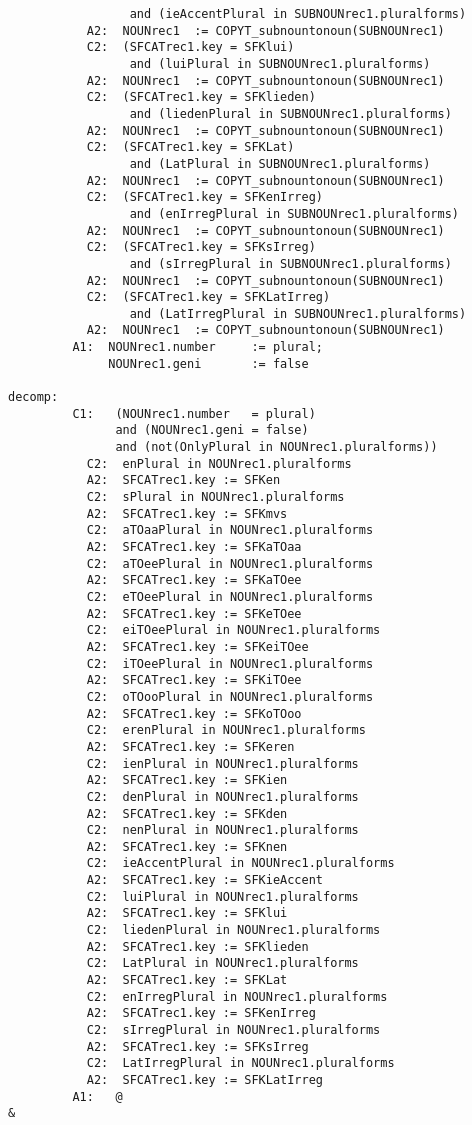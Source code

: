 \begin{verbatim}
                 and (ieAccentPlural in SUBNOUNrec1.pluralforms)
           A2:  NOUNrec1  := COPYT_subnountonoun(SUBNOUNrec1)
           C2:  (SFCATrec1.key = SFKlui) 
                 and (luiPlural in SUBNOUNrec1.pluralforms)
           A2:  NOUNrec1  := COPYT_subnountonoun(SUBNOUNrec1)
           C2:  (SFCATrec1.key = SFKlieden) 
                 and (liedenPlural in SUBNOUNrec1.pluralforms)
           A2:  NOUNrec1  := COPYT_subnountonoun(SUBNOUNrec1)
           C2:  (SFCATrec1.key = SFKLat) 
                 and (LatPlural in SUBNOUNrec1.pluralforms)
           A2:  NOUNrec1  := COPYT_subnountonoun(SUBNOUNrec1)
           C2:  (SFCATrec1.key = SFKenIrreg) 
                 and (enIrregPlural in SUBNOUNrec1.pluralforms)
           A2:  NOUNrec1  := COPYT_subnountonoun(SUBNOUNrec1)
           C2:  (SFCATrec1.key = SFKsIrreg) 
                 and (sIrregPlural in SUBNOUNrec1.pluralforms)
           A2:  NOUNrec1  := COPYT_subnountonoun(SUBNOUNrec1)
           C2:  (SFCATrec1.key = SFKLatIrreg) 
                 and (LatIrregPlural in SUBNOUNrec1.pluralforms)
           A2:  NOUNrec1  := COPYT_subnountonoun(SUBNOUNrec1)
         A1:  NOUNrec1.number     := plural;
              NOUNrec1.geni       := false

decomp:  
         C1:   (NOUNrec1.number   = plural) 
               and (NOUNrec1.geni = false) 
               and (not(OnlyPlural in NOUNrec1.pluralforms))
           C2:  enPlural in NOUNrec1.pluralforms
           A2:  SFCATrec1.key := SFKen
           C2:  sPlural in NOUNrec1.pluralforms
           A2:  SFCATrec1.key := SFKmvs
           C2:  aTOaaPlural in NOUNrec1.pluralforms
           A2:  SFCATrec1.key := SFKaTOaa
           C2:  aTOeePlural in NOUNrec1.pluralforms
           A2:  SFCATrec1.key := SFKaTOee
           C2:  eTOeePlural in NOUNrec1.pluralforms
           A2:  SFCATrec1.key := SFKeTOee
           C2:  eiTOeePlural in NOUNrec1.pluralforms
           A2:  SFCATrec1.key := SFKeiTOee
           C2:  iTOeePlural in NOUNrec1.pluralforms
           A2:  SFCATrec1.key := SFKiTOee
           C2:  oTOooPlural in NOUNrec1.pluralforms
           A2:  SFCATrec1.key := SFKoTOoo
           C2:  erenPlural in NOUNrec1.pluralforms
           A2:  SFCATrec1.key := SFKeren
           C2:  ienPlural in NOUNrec1.pluralforms
           A2:  SFCATrec1.key := SFKien
           C2:  denPlural in NOUNrec1.pluralforms
           A2:  SFCATrec1.key := SFKden
           C2:  nenPlural in NOUNrec1.pluralforms
           A2:  SFCATrec1.key := SFKnen
           C2:  ieAccentPlural in NOUNrec1.pluralforms
           A2:  SFCATrec1.key := SFKieAccent
           C2:  luiPlural in NOUNrec1.pluralforms
           A2:  SFCATrec1.key := SFKlui
           C2:  liedenPlural in NOUNrec1.pluralforms
           A2:  SFCATrec1.key := SFKlieden
           C2:  LatPlural in NOUNrec1.pluralforms
           A2:  SFCATrec1.key := SFKLat
           C2:  enIrregPlural in NOUNrec1.pluralforms
           A2:  SFCATrec1.key := SFKenIrreg
           C2:  sIrregPlural in NOUNrec1.pluralforms
           A2:  SFCATrec1.key := SFKsIrreg
           C2:  LatIrregPlural in NOUNrec1.pluralforms
           A2:  SFCATrec1.key := SFKLatIrreg
         A1:   @
&
\end{verbatim}
\newpage
